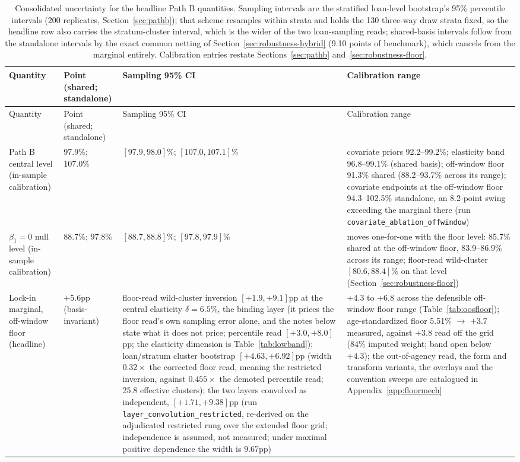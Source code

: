 \documentclass[12pt]{article}
\begin{document}
{\footnotesize
\begin{longtable}{@{}p{2.4cm}p{3.3cm}p{4.0cm}p{4.8cm}@{}}
\caption{Consolidated uncertainty for the headline Path B quantities. Sampling intervals are the stratified loan-level bootstrap's 95\% percentile intervals (200 replicates, Section~\ref{sec:pathb}); that scheme resamples within strata and holds the 130 three-way draw strata fixed, so the headline row also carries the stratum-cluster interval, which is the wider of the two loan-sampling reads; shared-basis intervals follow from the standalone intervals by the exact common netting of Section~\ref{sec:robustness-hybrid} (9.10 points of benchmark), which cancels from the marginal entirely. Calibration entries restate Sections~\ref{sec:pathb} and~\ref{sec:robustness-floor}.}
\label{tab:uncertainty}\\
\toprule
Quantity & Point (shared; standalone) & Sampling 95\% CI & Calibration range \\
\midrule
\endfirsthead
\toprule
Quantity & Point (shared; standalone) & Sampling 95\% CI & Calibration range \\
\midrule
\endhead
Path B central level (in-sample calibration) & 97.9\%; 107.0\% & $[97.9, 98.0]$\%; $[107.0, 107.1]$\% & covariate priors 92.2--99.2\%; elasticity band 96.8--99.1\% (shared basis); off-window floor 91.3\% shared (88.2--93.7\% across its range); covariate endpoints at the off-window floor 94.3--102.5\% standalone, an 8.2-point swing exceeding the marginal there (run \texttt{covariate\_ablation\_offwindow}) \\
$\beta_1 = 0$ null level (in-sample calibration) & 88.7\%; 97.8\% & $[88.7, 88.8]$\%; $[97.8, 97.9]$\% & moves one-for-one with the floor level: 85.7\% shared at the off-window floor, 83.9--86.9\% across its range; floor-read wild-cluster $[80.6, 88.4]\%$ on that level (Section~\ref{sec:robustness-floor}) \\
Lock-in marginal, off-window floor (headline) & $+5.6$pp (basis-invariant) & floor-read wild-cluster inversion $[+1.9, +9.1]$pp at the central elasticity $\delta = 6.5\%$, the binding layer (it prices the floor read's own sampling error alone, and the notes below state what it does not price; percentile read $[+3.0, +8.0]$pp; the elasticity dimension is Table~\ref{tab:lowband}); loan/stratum cluster bootstrap $[+4.63, +6.92]$pp (width $0.32\times$ the corrected floor read, meaning the restricted inversion, against $0.455\times$ the demoted percentile read; 25.8 effective clusters); the two layers convolved as independent, $[+1.71, +9.38]$pp (run \texttt{layer\_convolution\_restricted}, re-derived on the adjudicated restricted rung over the extended floor grid; independence is assumed, not measured; under maximal positive dependence the width is $9.67$pp) & $+4.3$ to $+6.8$ across the defensible off-window floor range (Table~\ref{tab:oosfloor}); age-standardized floor 5.51\% $\to$ $+3.7$ measured, against $+3.8$ read off the grid (84\% imputed weight; band open below $+4.3$); the out-of-agency read, the form and transform variants, the overlays and the convention sweeps are catalogued in Appendix~\ref{app:floormech} \\

\end{longtable}}
\end{document}
